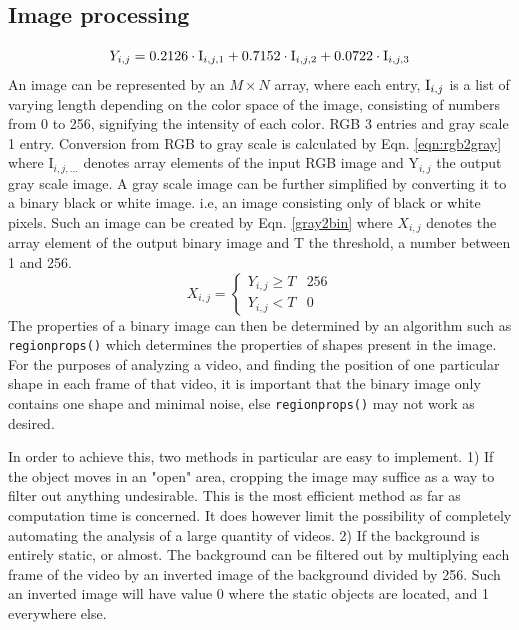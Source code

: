 \documentclass[11pt,a4paper]{article}
\begin{document}
  \subsection{Image processing\label{sect:imgpro}}
      \begin{equation}
        Y_{i, j} = 0.2126\cdot\textup{I}_{i, j, 1} 
        + 0.7152\cdot\textup{I}_{i, j, 2} 
        + 0.0722\cdot\textup{I}_{i, j, 3}
        \label{eqn:rgb2gray}
      \end{equation}
      An image can be represented by an $M \times N$ array, where each entry, $\textup{I}_{i, j}$ is a list of varying length depending on the color space of the image, consisting of numbers from 0 to 256, signifying the intensity of each color. RGB 3 entries and gray scale 1 entry. Conversion from RGB to gray scale is calculated by Eqn. \ref{eqn:rgb2gray} where I$_{i, j, ...}$ denotes array elements of the input RGB image and Y$_{i, j}$ the output gray scale image. \cite{wikipedia_contributors_grayscale_2018}
      \newline
      A gray scale image can be further simplified by converting it to a binary black or white image. i.e, an image consisting only of black or white pixels. Such an image can be created by Eqn. \ref{gray2bin} where $X_{i, j}$ denotes the array element of the output binary image and T the threshold, a number between 1 and 256.
      \begin{equation}
        X_{i, j} = \left\{ 
        \begin{matrix}
          Y_{i,j} \geq T & 256 \\
          Y_{i, j} < T & 0
        \end{matrix}
        \right.
        \label{gray2bin}
      \end{equation}
      The properties of a binary image can then be determined by an algorithm such as \lstinline{regionprops()} which determines the properties of shapes present in the image. For the purposes of analyzing a video, and finding the position of one particular shape in each frame of that video, it is important that the binary image only contains one shape and minimal noise, else \lstinline{regionprops()} may not work as desired.

      In order to achieve this, two methods in particular are easy to implement. 1) If the object moves in an "open" area, cropping the image may suffice as a way to filter out anything undesirable. This is the most efficient method as far as computation time is concerned. It does however limit the possibility of completely automating the analysis of a large quantity of videos. 2) If the background is entirely static, or almost. The background can be filtered out by multiplying each frame of the video by an inverted image of the background divided by 256. Such an inverted image will have value 0 where the static objects are located, and 1 everywhere else.
\end{document}
